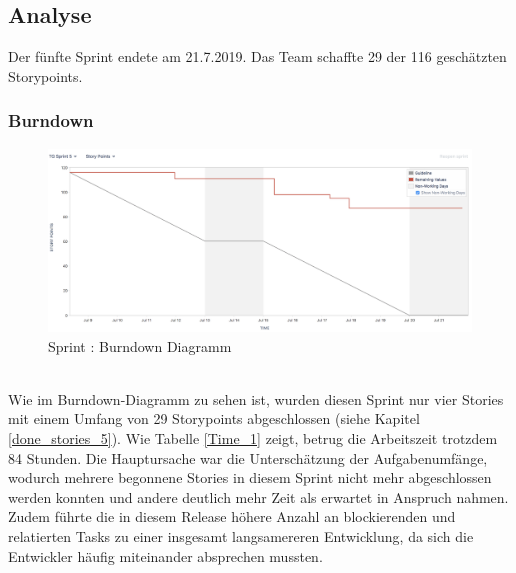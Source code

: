 \documentclass[12pt, titlepage]{scrartcl}
\newcommand{\RN}[1]{%
	\textup{\uppercase\expandafter{\romannumeral#1}}%
}
\begin{document}
        \subsection{Analyse}
        	Der f\"unfte Sprint endete am 21.7.2019. Das Team schaffte 29 der 116 gesch\"atzten Storypoints.
        	\subsubsection{Burndown}
	        	\begin{figure}[H] 
	        		\centering
	        		\includegraphics[width=\textwidth]{images/sprintV/burndown.png}
	        		\caption{Sprint \RN{5}: Burndown Diagramm}
	        		\label{Burndown_5}
	        	\end{figure}
        		\ \\ Wie im Burndown-Diagramm zu sehen ist, wurden diesen Sprint nur vier Stories mit einem Umfang von 29 Storypoints abgeschlossen (siehe Kapitel \ref{done_stories_5}). Wie Tabelle \ref{Time_1} zeigt, betrug die Arbeitszeit trotzdem 84 Stunden. Die Hauptursache war die Untersch\"atzung der Aufgabenumf\"ange, wodurch mehrere begonnene Stories in diesem Sprint nicht mehr abgeschlossen werden konnten und andere deutlich mehr Zeit als erwartet in Anspruch nahmen. Zudem f\"uhrte die in diesem Release h\"ohere Anzahl an blockierenden und relatierten Tasks zu einer insgesamt langsamereren Entwicklung, da sich die Entwickler h\"aufig miteinander absprechen mussten.
\end{document}
